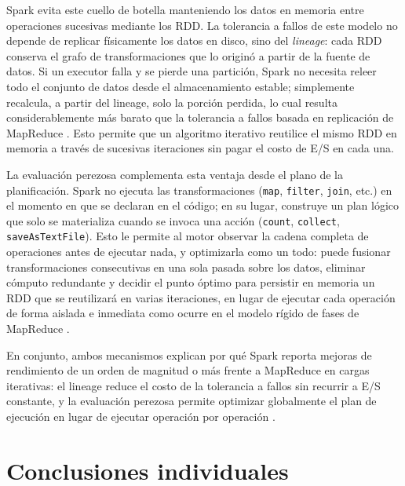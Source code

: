 \documentclass[11pt,a4paper]{article}
\begin{document}
Spark evita este cuello de botella manteniendo los datos en memoria entre
operaciones sucesivas mediante los RDD. La tolerancia a fallos de este
modelo no depende de replicar físicamente los datos en disco, sino del
\textit{lineage}: cada RDD conserva el grafo de transformaciones que lo
originó a partir de la fuente de datos. Si un executor falla y se pierde una
partición, Spark no necesita releer todo el conjunto de datos desde el
almacenamiento estable; simplemente recalcula, a partir del lineage, solo la
porción perdida, lo cual resulta considerablemente más barato que la
tolerancia a fallos basada en replicación de MapReduce \cite{zaharia2012}.
Esto permite que un algoritmo iterativo reutilice el mismo RDD en memoria a
través de sucesivas iteraciones sin pagar el costo de E/S en cada una.

La evaluación perezosa complementa esta ventaja desde el plano de la
planificación. Spark no ejecuta las transformaciones (\texttt{map},
\texttt{filter}, \texttt{join}, etc.) en el momento en que se declaran en el
código; en su lugar, construye un plan lógico que solo se materializa cuando
se invoca una acción (\texttt{count}, \texttt{collect}, \texttt{saveAsTextFile}).
Esto le permite al motor observar la cadena completa de operaciones antes de
ejecutar nada, y optimizarla como un todo: puede fusionar transformaciones
consecutivas en una sola pasada sobre los datos, eliminar cómputo redundante
y decidir el punto óptimo para persistir en memoria un RDD que se reutilizará
en varias iteraciones, en lugar de ejecutar cada operación de forma aislada e
inmediata como ocurre en el modelo rígido de fases de MapReduce
\cite{zaharia2016}.

En conjunto, ambos mecanismos explican por qué Spark reporta mejoras de
rendimiento de un orden de magnitud o más frente a MapReduce en cargas
iterativas: el lineage reduce el costo de la tolerancia a fallos sin recurrir
a E/S constante, y la evaluación perezosa permite optimizar globalmente el
plan de ejecución en lugar de ejecutar operación por operación
\cite{zaharia2016}.

\section{Conclusiones individuales}
\end{document}
